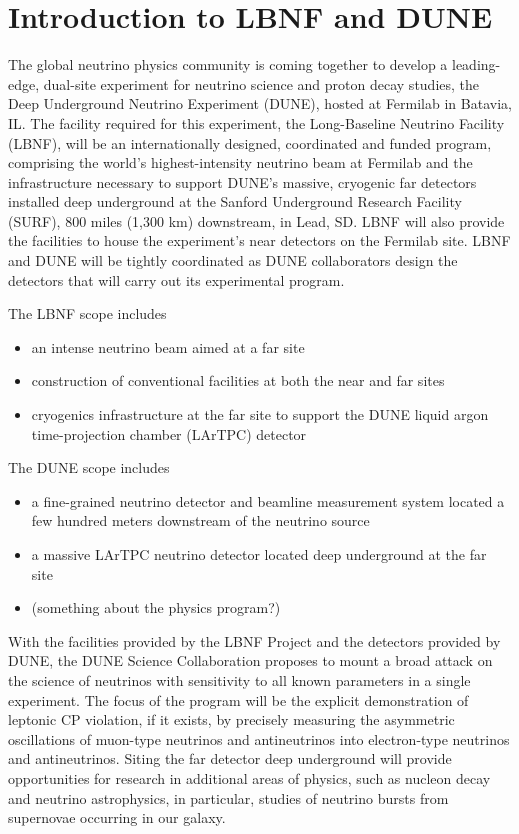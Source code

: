 
\section{Introduction to LBNF and DUNE}
\label{sec:intro-lbnfdune-eachvol}

The global neutrino physics community is coming together to develop a leading-edge, dual-site 
experiment for neutrino science and proton decay studies, the Deep Underground Neutrino Experiment 
(DUNE), hosted at Fermilab in Batavia, IL. The facility required for this experiment, the Long-Baseline 
Neutrino Facility (LBNF), will be an internationally designed, coordinated and funded program, comprising 
the world's highest-intensity neutrino beam at Fermilab and the infrastructure necessary to support 
DUNE's massive, cryogenic far detectors installed deep underground at the Sanford Underground 
Research Facility (SURF), 800 miles (1,300 km) downstream, in Lead, SD. LBNF will also provide the 
facilities to house the experiment's near detectors on the Fermilab site. LBNF and DUNE will be tightly coordinated as DUNE collaborators design the detectors that will carry out its experimental program. 
  
The LBNF scope includes 
\begin{itemize}
\item an intense neutrino beam aimed at a far site
\item construction of conventional facilities at both the near and far sites
\item cryogenics infrastructure at the far site to support the DUNE liquid argon time-projection
chamber (LArTPC) detector
\end{itemize}

The DUNE scope includes
\begin{itemize}
\item a fine-grained neutrino detector and beamline measurement system located a few hundred meters downstream of the neutrino source
\item a massive LArTPC neutrino detector located deep underground at the far site
\item (something about the physics program?)
\end{itemize}

With the facilities provided by the LBNF Project and the detectors provided by DUNE, the DUNE Science Collaboration proposes to mount a broad attack on the science of neutrinos with sensitivity 
to all known parameters in a single experiment.  The focus of the program will be the explicit 
demonstration of leptonic CP violation, if it exists, by precisely measuring the asymmetric oscillations of 
muon-type neutrinos and antineutrinos into electron-type neutrinos and antineutrinos.
Siting the far detector deep underground will provide
opportunities for research in additional areas of physics, such as nucleon decay and neutrino
astrophysics, in particular, studies of neutrino bursts from supernovae occurring in our galaxy.

